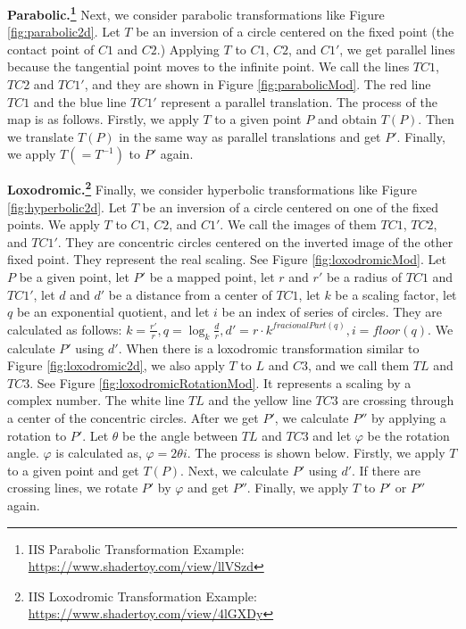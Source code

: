  \noindent\textbf{Parabolic.\footnote{IIS Parabolic Transformation Example: \url{https://www.shadertoy.com/view/llVSzd}}}
 Next, we consider parabolic transformations like Figure \ref{fig:parabolic2d}.
 Let $T$ be an inversion of a circle centered on the fixed point (the contact point of $C1$ and $C2$.)
 Applying $T$ to $C1$, $C2$, and $C1'$, we get parallel lines because
 the tangential point moves to the infinite point.
 We call the lines $TC1$, $TC2$ and $ TC1'$, and they are shown in
 Figure \ref{fig:parabolicMod}.
 The red line $TC1$ and the blue line $TC1'$ represent a parallel translation.
 The process of the map is as follows.
 Firstly, we apply $T$ to a given point $P$ and obtain $T(P)$.
 Then we translate $T(P)$ in the same way as parallel translations and get $P'$.
 Finally, we apply $T(= T^{-1}) $ to $P'$ again.

 \noindent\textbf{Loxodromic.\footnote{IIS Loxodromic Transformation Example: \url{https://www.shadertoy.com/view/4lGXDy}}}
 Finally, we consider hyperbolic
 transformations like Figure \ref{fig:hyperbolic2d}.
 Let $T$ be an inversion of a circle centered on one of the fixed
 points.
 We apply $T$ to $C1$, $C2$, and $C1'$.
 We call the images of them $TC1$, $TC2$, and $TC1'$.
 They are concentric circles centered on the inverted image
 of the other fixed point.
 They represent the real scaling.
 See Figure \ref{fig:loxodromicMod}.
 Let $P$ be a given point,
 let $P'$ be a mapped point,
 let $r$ and $r'$ be a radius of $TC1$ and $TC1'$,
 let $d$ and $d'$ be a distance from a center of $TC1$,
 let $k$ be a scaling factor,
 let $q$ be an exponential quotient, and let $i$ be an index of
 series of circles. They are calculated as follows:
 \begin{math}
  k = \frac{r'}{r},
  q = \log_{k} \frac{d}{r},
  d' = r \cdot k^{fracionalPart(q)},
  i = floor(q).
 \end{math}
 We calculate $P'$ using $d'$.
 When there is a loxodromic transformation similar to Figure \ref{fig:loxodromic2d},
 we also apply $T$ to $L$ and $C3$, and we call them $TL$ and $TC3$.
 See Figure \ref{fig:loxodromicRotationMod}.
 It represents a scaling by a complex number.
 The white line $TL$ and the yellow line $TC3$ are crossing
 through a center of the concentric circles.
 After we get $P'$, we calculate $P''$ by applying a rotation to $P'$.
 Let $\theta$ be the angle between $TL$ and $TC3$ and
 let $\varphi$ be the rotation angle.
 $\varphi$ is calculated as, $\varphi = 2 \theta i$.
 The process is shown below.
 Firstly, we apply $T$ to a given point and get $T(P)$.
 Next, we calculate $P'$ using $d'$.
 If there are crossing lines, we rotate $P'$ by $\varphi$ and get $P''$.
 Finally, we apply $T$ to $P'$ or $P''$ again.


